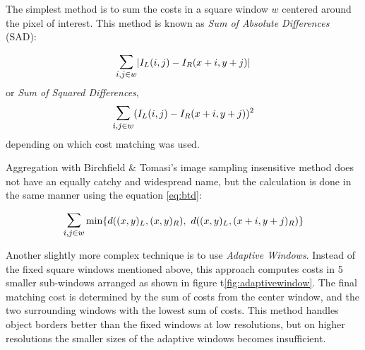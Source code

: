 The simplest method is to sum the costs in a square window $w$ centered around
the pixel of interest. This method is known as \textit{Sum of Absolute
Differences} (SAD):

\begin{equation}
  \label{eq:sad}
  \mathlarger{\mathlarger{\sum}}_{i,j \in w} |I_L(i,j) - I_R(x + i, y + j)|
\end{equation}
or \textit{Sum of Squared Differences},
\begin{equation}
  \label{eq:ssd}
  \mathlarger{\mathlarger{\sum}}_{i,j \in w} (I_L(i,j) - I_R(x + i, y  + j))^2
\end{equation}
depending on which cost matching was used.

Aggregation with Birchfield \& Tomasi's image sampling insensitive method does
not have an equally catchy and widespread name, but the calculation is done in
the same manner using the equation \ref{eq:btd}:

\begin{equation}
  \label{eq:bt}
  \mathlarger{\mathlarger{\sum}}_{i,j \in w} \min\{
  d((x,y)_L,(x,y)_R), \ d((x,y)_L, (x+i,y+j)_R) \}
\end{equation}

Another slightly more complex technique is to use \textit{Adaptive
Windows}\cite{Okutomi and Kanade, 1992; Kanade and Okutomi, 1994;   Veksler,
2001; Kang et al., 2001)}. Instead of the fixed square windows mentioned
above, this approach computes costs in 5 smaller sub-windows arranged as shown
in figure t\ref{fig:adaptivewindow}. The final matching cost is determined by
the sum of costs from the center window, and the two surrounding windows with
the lowest sum of costs. This method handles object borders better than the
fixed windows at low resolutions, but on higher resolutions the smaller sizes
of the adaptive windows becomes insufficient\cite{gpugems}.


